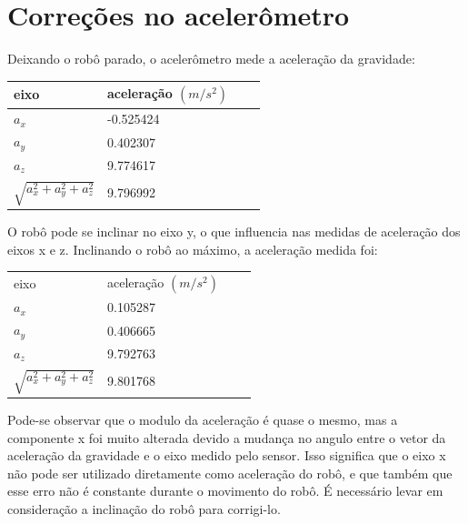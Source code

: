 \documentclass[
	12pt,				%
	openright,			%
	twoside,			%
	convert,
	a4paper,			%
	english,			%
	french,				%
	spanish,			%
	brazil				%
	]{abntex2}
\begin{document}
\section{Correções no acelerômetro}\label{sec:acc_fix}
Deixando o robô parado, o acelerômetro mede a aceleração da gravidade:
\begin{center}
\begin{tabular}{ | l | l | l | p{5cm} |}
    \hline
    eixo & aceleração $(m/s^2)$ \\ \hline
    $a_x$ & -0.525424 \\
    $a_y$ & 0.402307 \\
    $a_z$ & 9.774617 \\
    $ \sqrt{a_x^2+a_y^2+a_z^2} $ & 9.796992 \\
    \hline
\end{tabular}
\end{center}
O robô pode se inclinar no eixo y, o que influencia nas medidas de aceleração dos eixos x e z. Inclinando o robô ao máximo, a aceleração medida foi:
\begin{center}
\begin{tabular}{ | l | l | l | p{5cm} |}
    \hline
    eixo & aceleração $(m/s^2)$ \\
    $a_x$ & 0.105287 \\
    $a_y$ & 0.406665 \\
    $a_z$ & 9.792763 \\
    $ \sqrt{a_x^2+a_y^2+a_z^2} $ & 9.801768 \\
    \hline
\end{tabular}
\end{center}
Pode-se observar que o modulo da aceleração é quase o mesmo, mas a componente x foi muito alterada devido a mudança no angulo entre o vetor da aceleração da gravidade e o eixo medido pelo sensor. Isso significa que o eixo x não pode ser utilizado diretamente como aceleração do robô, e que também que esse erro não é constante durante o movimento do robô. É necessário levar em consideração a inclinação do robô para corrigi-lo.
\end{document}
